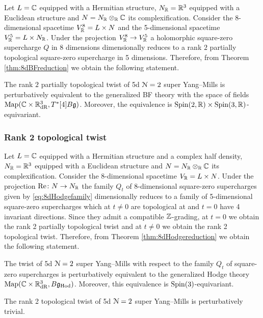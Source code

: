 \documentclass[10pt, oneside]{article}
\newcommand{\Hod}{\mathrm{Hod}}
\renewcommand{\Re}{\mathrm{Re}}
\begin{document}
Let $L = \mathbb C$ equipped with a Hermitian structure, $N_\mathbb R=\mathbb R^3$ equipped with a Euclidean structure and $N=N_\mathbb R\otimes_\mathbb R\mathbb C$ its complexification. Consider the 8-dimensional spacetime $V^8_\mathbb R=L\times N$ and the 5-dimensional spacetime $V^5_\mathbb R=L\times N_\mathbb R$. Under the projection $V^8_\mathbb R\rightarrow V^5_\mathbb R$ a holomorphic square-zero supercharge $Q$ in 8 dimensions dimensionally reduces to a rank $2$ partially topological square-zero supercharge in 5 dimensions. Therefore, from Theorem \ref{thm:8dBFreduction} we obtain the following statement.

\begin{theorem}
The rank $2$ partially topological twist of 5d $\mathcal N=2$ super Yang--Mills is perturbatively equivalent to the generalized BF theory with the space of fields $\operatorname{Map}(\mathbb C\times \mathbb R^3_{\mathrm{dR}}, T^*[4] B\mathfrak g)$. Moreover, the equivalence is $\mathrm{Spin}(2, \mathbb R)\times\mathrm{Spin}(3, \mathbb R)$-equivariant.
\end{theorem}

\subsubsection{Rank 2 topological twist}
\label{sect:5drank2topologicaltwist}

Let $L=\mathbb C$ equipped with a Hermitian structure and a complex half density, $N_\mathbb R=\mathbb R^3$ equipped with a Euclidean structure and $N=N_\mathbb R\otimes_\mathbb R\mathbb C$ its complexification. Consider the 8-dimensional spacetime $V_\mathbb R=L\times N$. Under the projection $\Re\colon N\rightarrow N_\RR$ the family $Q_t$ of 8-dimensional square-zero supercharges given by \eqref{eq:8dHodgefamily} dimensionally reduces to a family of 5-dimensional square-zero supercharges which at $t\neq 0$ are topological at and $t=0$ have 4 invariant directions. Since they admit a compatible $\mathbb Z$-grading, at $t=0$ we obtain the rank 2 partially topological twist and at $t\neq 0$ we obtain the rank 2 topological twist. Therefore, from Theorem \ref{thm:8dHodgereduction} we obtain the following statement.

\begin{theorem}
The twist of 5d $\mathcal N=2$ super Yang--Mills with respect to the family $Q_t$ of square-zero supercharges is perturbatively equivalent to the generalized Hodge theory $\map(\CC\times \RR^3_{\mathrm{dR}}, B\fg_{\Hod})$. Moreover, this equivalence is $\mathrm{Spin}(3)$-equivariant.
\label{thm:5dHodgetwist}
\end{theorem}

\begin{corollary}
The rank 2 topological twist of 5d $\mathcal N=2$ super Yang--Mills is perturbatively trivial.
\label{cor:5drank2topologicaltwist}
\end{corollary}
\end{document}
